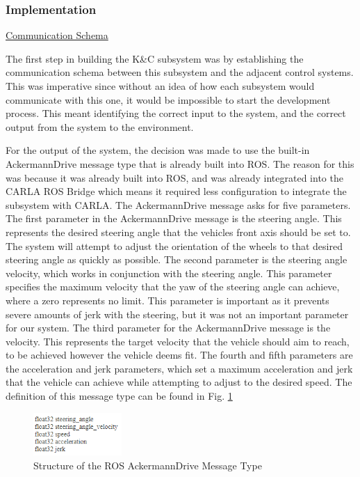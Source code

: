 \documentclass[titlepage]{article}
\begin{document}
{\subsubsection{Implementation}
\underline{Communication Schema}

The first step in building the K\&C subsystem was by establishing the communication schema between this subsystem and the adjacent control systems. This was imperative since without an idea of how each subsystem would communicate with this one, it would be impossible to start the development process. This meant identifying the correct input to the system, and the correct output from the system to the environment.

For the output of the system, the decision was made to use the built-in AckermannDrive message type that is already built into ROS. The reason for this was because it was already built into ROS, and was already integrated into the CARLA ROS Bridge which means it required less configuration to integrate the subsystem with CARLA. The AckermannDrive message asks for five parameters. The first parameter in the AckermannDrive message is the steering angle. This represents the desired steering angle that the vehicles front axis should be set to. The system will attempt to adjust the orientation of the wheels to that desired steering angle as quickly as possible. The second parameter is the steering angle velocity, which works in conjunction with the steering angle. This parameter specifies the maximum velocity that the yaw of the steering angle can achieve, where a zero represents no limit. This parameter is important as it prevents severe amounts of jerk with the steering, but it was not an important parameter for our system. The third parameter for the AckermannDrive message is the velocity. This represents the target velocity that the vehicle should aim to reach, to be achieved however the vehicle deems fit. The fourth and fifth parameters are the acceleration and jerk parameters, which set a maximum acceleration and jerk that the vehicle can achieve while attempting to adjust to the desired speed. The definition of this message type can be found in Fig. \ref{fig:ackermann}

\begin{figure}
	\centering
	\includegraphics[width=0.3\textwidth]{ackeramnn_drive}
	\caption{Structure of the ROS AckermannDrive Message Type}
	\label{fig:ackermann}
\end{figure}

}
\end{document}
